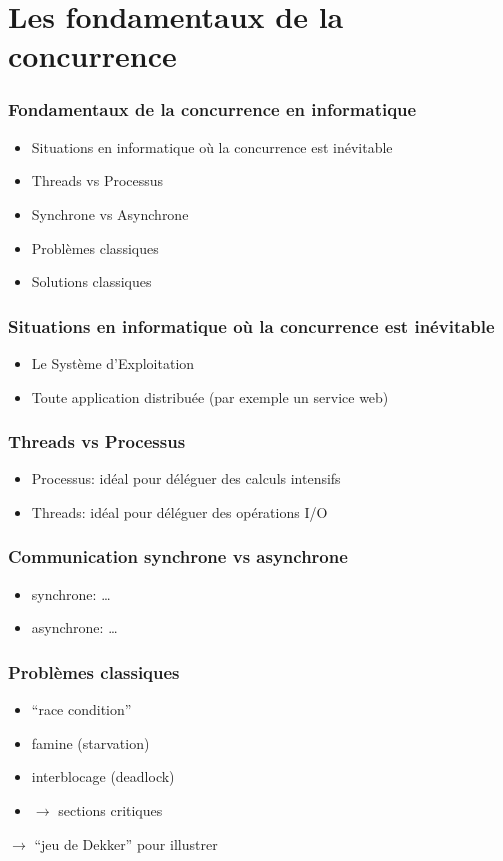 \documentclass{beamer}
\begin{document}
\section{Les fondamentaux de la concurrence}
\begin{frame}
  \frametitle{Fondamentaux de la concurrence en informatique}
  \begin{itemize}
  \item Situations en informatique où la concurrence est inévitable
  \item Threads vs Processus
  \item Synchrone vs Asynchrone
  \item Problèmes classiques
  \item Solutions classiques
  \end{itemize}
\end{frame}
\begin{frame}
  \frametitle{Situations en informatique où la concurrence est inévitable}
  \begin{itemize}
  \item Le Système d'Exploitation
  \item Toute application distribuée (par exemple un service web)
  \end{itemize}
\end{frame}
\begin{frame}
  \frametitle{Threads vs Processus}
  \begin{itemize}
  \item Processus: idéal pour déléguer des calculs intensifs
  \item Threads: idéal pour déléguer des opérations I/O
  \end{itemize}
\end{frame}
\begin{frame}
  \frametitle{Communication synchrone vs asynchrone}
  \begin{itemize}
  \item synchrone: \ldots
  \item asynchrone: \ldots
  \end{itemize}
\end{frame}
\begin{frame}
  \frametitle{Problèmes classiques}
  \begin{itemize}
  \item ``race condition''
  \item famine (starvation)
  \item interblocage (deadlock)
  \item $\rightarrow$ sections critiques
  \end{itemize}
  $\rightarrow$ ``jeu de Dekker'' pour illustrer 
\end{frame}
\end{document}
